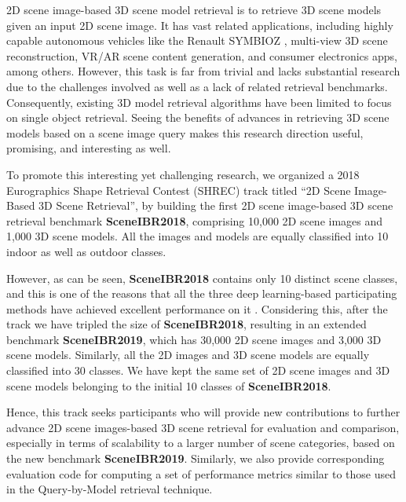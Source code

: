 \documentclass[../main.tex]{subfiles}
\begin{document}
2D scene image-based 3D scene model retrieval is to retrieve 3D scene models given an input 2D scene image. It has vast related applications, including highly capable autonomous vehicles like the Renault SYMBIOZ \cite{Renault} \cite{Youtube}, multi-view 3D scene reconstruction, VR/AR scene content generation, and consumer electronics apps, among others. However, this task is far from trivial and lacks substantial research due to the challenges involved as well as a lack of related retrieval benchmarks. Consequently, existing 3D model retrieval algorithms have been limited to focus on single object retrieval. Seeing the benefits of advances in retrieving 3D scene models based on a scene image query makes this research direction useful, promising, and interesting as well.

To promote this interesting yet challenging research, we organized a 2018 Eurographics Shape Retrieval Contest (SHREC) track \cite{SHREC18-SceneIBR-Track} titled “2D Scene Image-Based 3D Scene Retrieval”, by building the first 2D scene image-based 3D scene retrieval benchmark \textbf{SceneIBR2018}, comprising 10,000 2D scene images and 1,000 3D scene models. All the images and models are equally classified into 10 indoor as well as outdoor classes.

However, as can be seen, \textbf{SceneIBR2018} contains only 10 distinct scene classes, and this is one of the reasons that all the three deep learning-based participating methods have achieved excellent performance on it \cite{MIPR}. Considering this, after the track we have tripled the size of \textbf{SceneIBR2018}, resulting in an extended benchmark \textbf{SceneIBR2019}, which has 30,000 2D scene images and 3,000 3D scene models. Similarly, all the 2D images and 3D scene models are equally classified into 30 classes. We have kept the same set of 2D scene images and 3D scene models belonging to the initial 10 classes of \textbf{SceneIBR2018}.

Hence, this track seeks participants who will provide new contributions to further advance 2D scene images-based 3D scene retrieval for evaluation and comparison, especially in terms of scalability to a larger number of scene categories, based on the new benchmark \textbf{SceneIBR2019}. Similarly, we also provide corresponding evaluation code for computing a set of performance metrics similar to those used in the Query-by-Model retrieval technique.
\end{document}
